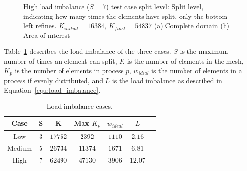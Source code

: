 \begin{figure}[H]
    \centering
    \hfill
    \caption{High load imbalance (\(S = 7\)) test case split level: Split level, indicating how many times the elements have split, only the bottom left refines. \(K_{initial} = 16384\), \(K_{final} = 54837\) (a) Complete domain (b) Area of interest}\label{fig:load_imbalance_case_high_s}
\end{figure}

Table~\ref{table:load_imbalance} describes the load imbalance of the three cases. \(S\) is the
maximum number of times an element can split, \(K\) is the number of elements in the mesh, \(K_p\)
is the number of elements in process \(p\), \(w_{ideal}\) is the number of elements in a process if
evenly distributed, and \(L\) is the load imbalance as described in
Equation~\ref{equ:load_imbalance}.

\begin{table}[H]
    \centering
    \begin{tabular}{ c c c c c c c }
        Case & S & K & Max \(K_p\) & \(w_{ideal}\) & \(L\) \\
        \midrule
        Low & \(3\) & \(17752\) & \(2392\) & \(1110\) & \(2.16\) \\
        Medium & \(5\) & \(26734\) & \(11374\) & \(1671\) & \(6.81\) \\
        High & \(7\) & \(62490\) & \(47130\) & \(3906\) & \(12.07\) \\
    \end{tabular}
    \caption{Load imbalance cases.}\label{table:load_imbalance}
\end{table}

